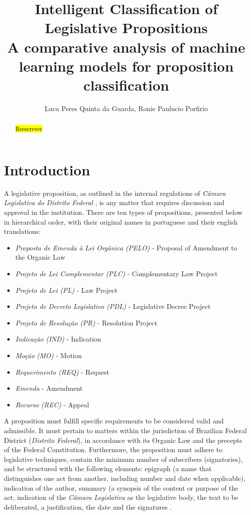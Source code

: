 \documentclass[12pt]{article}
\title{Intelligent Classification of Legislative Propositions \\ \normalsize A comparative analysis of machine learning models for proposition classification}
\author{Luca Peres Quinta da Guarda\inst{1}, Ronie Paulucio Porfirio\inst{1}}
\newcommand{\revisar}[1]{\hl{#1}}
\begin{document}
 
	
	\maketitle
	
\begin{abstract}
	\revisar{Reescrever}
\end{abstract}

\section{Introduction}


A legislative proposition, as outlined in the internal regulations of \emph{Câmara Legislativa do Distrito Federal} \cite{CLDF2018}, is any matter that requires discussion and approval in the institution. There are ten types of propositions, presented below in hierarchical order, with their original names in portuguese and their english translations:

\begin{itemize}
	\item \emph{Proposta de Emenda à Lei Orgânica (PELO)} - Proposal of Amendment to the Organic Law 
	\item \emph{Projeto de Lei Complementar (PLC)} - Complementary Law Project
	\item \emph{Projeto de Lei (PL)} - Law Project
	\item \emph{Projeto de Decreto Legislativo (PDL)} - Legislative Decree Project
	\item \emph{Projeto de Resolução (PR)} - Resolution Project 
	\item \emph{Indicação (IND)} - Indication
	\item \emph{Moção (MO)} - Motion
	\item \emph{Requerimento (REQ)} - Request
	\item \emph{Emenda} - Amendment
	\item \emph{Recurso (REC)} - Appeal
\end{itemize}

A proposition must fulfill specific requirements to be considered valid and admissible. It must pertain to matters within the jurisdiction of Brazilian Federal District (\emph{Distrito Federal}), in accordance with its Organic Law and the precepts of the Federal Constitution. Furthermore, the proposition must adhere to legislative techniques, contain the minimum number of subscribers (signatories), and be structured with the following elements: epigraph (a name that distinguishes one act from another, including number and date when applicable), indication of the author, summary (a synopsis of the content or purpose of the act, indication of the \emph{Câmara Legislativa} as the legislative body, the text to be deliberated, a justification, the date and the signatures \cite{Conceitos2024}.
\end{document}
